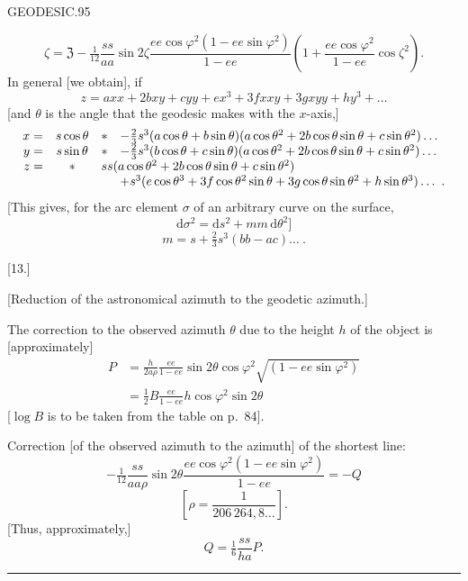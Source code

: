 \clearpage
\noindent\mbox{}\hfill GEODESIC.\hfill 95\par
\[
\zeta=\mathfrak Z-\tfrac1{12}\frac{ss}{aa}\sin2\zeta\frac{ee\cos\varphi^2(1-ee\sin\varphi^2)}{1-ee}\left(1+\frac{ee\cos\varphi^2}{1-ee}\cos\zeta^2\right).
\]
In general [we obtain], if
\[
z=axx+2bxy+cyy+ex^3+3fxxy+3gxyy+hy^3+\ldots
\]
[and $\theta$ is the angle that the geodesic makes with the $x$-axis,]
\[
\begin{array}{rcll}
x=&s\cos\theta&*&-\tfrac23s^3(a\cos\theta+b\sin\theta)(a\cos\theta^2+2b\cos\theta\sin\theta+c\sin\theta^2)\ldots\\
y=&s\sin\theta&*&-\tfrac23s^3(b\cos\theta+c\sin\theta)(a\cos\theta^2+2b\cos\theta\sin\theta+c\sin\theta^2)\ldots\\
z=&*&\multicolumn{2}{l}{ss(a\cos\theta^2+2b\cos\theta\sin\theta+c\sin\theta^2)}\\
&&&+s^3(e\cos\theta^3+3f\cos\theta^2\sin\theta+3g\cos\theta\sin\theta^2+h\sin\theta^3)\ldots\ .
\end{array}
\]
[This gives, for the arc element $\sigma$ of an arbitrary curve on the surface,
\[
\mathrm d\sigma^2=\mathrm ds^2+mm\,\mathrm d\theta^2]
\]
\[
m=s+\tfrac23s^3(bb-ac)\ldots\ .
\]
\begin{center}[13.]\end{center}
\begin{center}[Reduction of the astronomical azimuth to the geodetic azimuth.]\end{center}
The correction to the observed azimuth $\theta$ due to the height $h$ of the object is [approximately]
\[
\begin{aligned}
P&=\frac h{2a\rho}\frac{ee}{1-ee}\sin2\theta\cos\varphi^2\sqrt{(1-ee\sin\varphi^2)}\\
&=\tfrac12B\frac{ee}{1-ee}h\cos\varphi^2\sin2\theta
\end{aligned}
\]
[$\log B$ is to be taken from the table on p.\ 84].

Correction [of the observed azimuth to the azimuth] of the shortest line:
\[
-\tfrac1{12}\frac{ss}{aa\rho}\sin2\theta\frac{ee\cos\varphi^2(1-ee\sin\varphi^2)}{1-ee}=-Q
\]
\[
\left[\rho=\frac1{206\,264{,}8\ldots}\right].
\]
[Thus, approximately,]
\[
Q=\tfrac16\frac{ss}{ha}P.
\]
\begin{center}\rule{.18\textwidth}{.4pt}\end{center}

